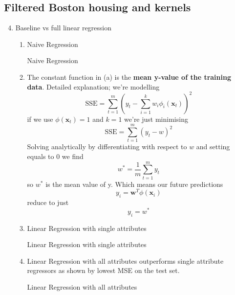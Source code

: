 \documentclass{article}
\begin{document}
\subsection{Filtered Boston housing and kernels}
    \begin{enumerate}
        \setcounter{enumi}{3}
        \item Baseline vs full linear regression
        \begin{enumerate}
            \item Naive Regression
            \begin{table}[H]
                \centering
                
                \caption{Naive Regression}
                \label{fig:naive_regression}
            \end{table}
            \item The constant function in (a) is the \textbf{mean y-value of the training data}. Detailed explanation; we're modelling
                $$\text{SSE} = \sum_{t=1}^{m} \left( y_t - \sum_{i=1}^{k} w_i \phi_i(\mathbf{x}_t) \right)^2$$
                if we use $\phi(\mathbf{x}_t) = 1$ and $k=1$ we're just minimising
                $$\text{SSE} = \sum_{t=1}^{m} (y_t - w)^2$$
                Solving analytically by differentiating with respect to $w$ and setting equals to 0 we find
                $$w^*=\frac{1}{m}\sum_{t=1}^{m}y_t$$
                so $w^*$ is the mean value of y. Which means our future predictions
                $$y_i = \mathbf{w}^T\phi(\mathbf{x}_i)$$
                reduce to just
                $$y_i = w^*$$
            \item Linear Regression with single attributes
            \begin{table}[h]
                \centering
                
                \caption{Linear Regression with single attributes}
                \label{fig:single_attr_regression}
            \end{table}
            \item Linear Regression with all attributes outperforms single attribute regressors as shown by lowest MSE on the test set.
            \begin{table}[h]
                \centering
                
                \caption{Linear Regression with all attributes}
                \label{fig:all_attrs_regression}
            \end{table}
        \end{enumerate}

    \end{enumerate}
\end{document}
